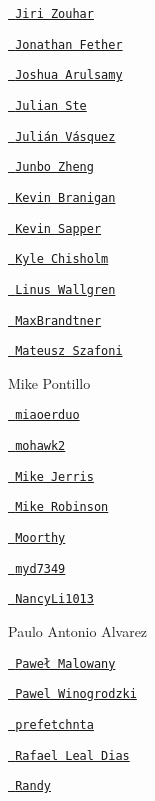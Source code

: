 \begin{DoxyItemize}
\item \href{https://github.com/loigu}{\texttt{ Jiri Zouhar}}
\item \href{https://github.com/jfether}{\texttt{ Jonathan Fether}}
\item \href{https://github.com/jarulsamy}{\texttt{ Joshua Arulsamy}}
\item \href{https://github.com/julian-st}{\texttt{ Julian Ste}}
\item \href{https://github.com/juvasquezg}{\texttt{ Julián Vásquez}}
\item \href{https://github.com/Junbo-Zheng}{\texttt{ Junbo Zheng}}
\item \href{https://github.com/kbranigan}{\texttt{ Kevin Branigan}}
\item \href{https://github.com/sappo}{\texttt{ Kevin Sapper}}
\item \href{https://github.com/ChisholmKyle}{\texttt{ Kyle Chisholm}}
\item \href{https://github.com/ecksun}{\texttt{ Linus Wallgren}}
\item \href{https://github.com/MaxBrandtner}{\texttt{ Max\+Brandtner}}
\item \href{https://github.com/raiden00pl}{\texttt{ Mateusz Szafoni}}
\item Mike Pontillo
\item \href{https://github.com/miaoerduo}{\texttt{ miaoerduo}}
\item \href{https://github.com/mohawk2}{\texttt{ mohawk2}}
\item \href{https://github.com/mjerris}{\texttt{ Mike Jerris}}
\item \href{https://github.com/mhrobinson}{\texttt{ Mike Robinson}}
\item \href{https://github.com/moorthy-bs}{\texttt{ Moorthy}}
\item \href{https://github.com/myd7349}{\texttt{ myd7349}}
\item \href{https://github.com/NancyLi1013}{\texttt{ Nancy\+Li1013}}
\item Paulo Antonio Alvarez
\item \href{https://github.com/PawelMalowany}{\texttt{ Paweł Malowany}}
\item \href{https://github.com/PawelWMS}{\texttt{ Pawel Winogrodzki}}
\item \href{https://github.com/prefetchnta}{\texttt{ prefetchnta}}
\item \href{https://github.com/rafaeldias}{\texttt{ Rafael Leal Dias}}
\item \href{https://github.com/randy408}{\texttt{ Randy}}

\end{DoxyItemize}

